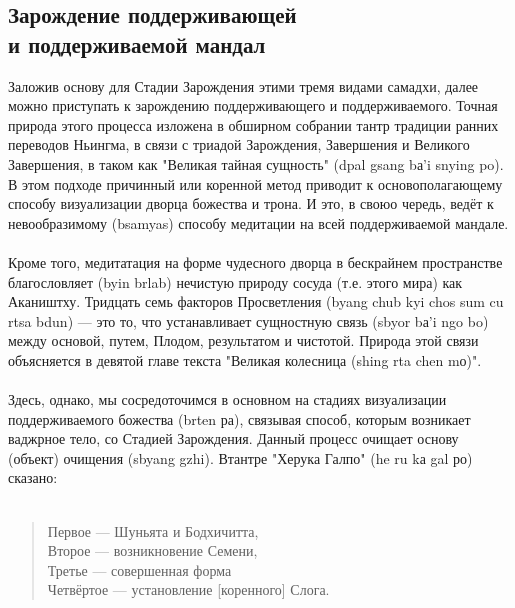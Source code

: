 \subsection{Зарождение поддерживающей \\ и поддерживаемой мандал}

Заложив основу для Стадии Зарождения этими тремя видами самадхи, далее можно
приступать к зарождению поддерживающего и поддерживаемого. Точная природа этого
процесса изложена в обширном собрании тантр традиции ранних переводов Ньингма, в связи
с триадой Зарождения, Завершения и Великого Завершения, в таком как "Великая тайная
сущность" (dpal gsang bа'i snying po). В этом подходе причинный или коренной метод
приводит к основополагающему способу визуализации дворца божества и трона. И это, в
своюо чередь, ведёт к невообразимому (bsamyas) способу медитации на всей
поддерживаемой мандале.\\
\\
Кроме того, медитатация на форме чудесного дворца в бескрайнем пространстве
благословляет (byin brlab) нечистую природу сосуда (т.е. этого мира) как Акаништху.
Тридцать семь факторов Просветления (byang chub kyi chos sum cu rtsa bdun) — это то, что
устанавливает сущностную связь (sbyor bа'i ngo bo) между основой, путем, Плодом,
результатом и чистотой. Природа этой связи объясняется в девятой главе текста
"Великая колесница (shing rta chen mо)".\\
\\
Здесь, однако, мы сосредоточимся в основном на стадиях визуализации поддерживаемого
божества (brten ра), связывая способ, которым возникает ваджрное тело, со Стадией
Зарождения. Данный процесс очищает основу (объект) очищения (sbyang gzhi).
Втантре "Херука Галпо" (he ru kа gal ро) сказано:\\
\\
\begin{verse}
Первое — Шуньята и Бодхичитта,\\
Второе — возникновение Семени,\\
Третье — совершенная форма\\
Четвёртое — установление [коренного] Слога.
\end{verse}

